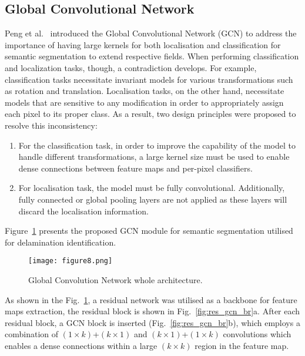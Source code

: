 \documentclass[runningheads]{llncs}
\begin{document}
\subsection{Global Convolutional Network}
Peng et al.~\cite{Peng2017} introduced the Global Convolutional Network (GCN) to address the importance of having large kernels for both localisation and classification for semantic segmentation to extend respective fields.
When performing classification and localization tasks, though, a contradiction develops.
For example, classification tasks necessitate invariant models for various transformations such as rotation and translation.
Localisation tasks, on the other hand, necessitate models that are sensitive to any modification in order to appropriately assign each pixel to its proper class.
As a result, two design principles were proposed to resolve this inconsistency:
\begin{enumerate}
	\item For the classification task, in order to improve the capability of 
	the model to handle different transformations, a large kernel size must be 
	used to enable dense connections between feature maps and per-pixel 
	classifiers.
	\item For localisation task, the model must be fully convolutional. 
	Additionally, fully connected or global pooling layers are not applied as 
	these layers will discard the localisation information. 
\end{enumerate}
Figure~\ref{fig:gcn} presents the proposed GCN module for semantic segmentation 
utilised for delamination identification.
\begin{figure} [h!]
	\begin{center}
		\texttt{[image: figure8.png]}
	\end{center}
	\caption{Global Convolution Network whole architecture.} 
	\label{fig:gcn}
\end{figure}
As shown in the Fig.~\ref{fig:gcn}, a residual network was utilised as a backbone for 
feature maps extraction, the residual block is shown in 
Fig.~\ref{fig:res_gcn_br}a.
After each residual block, a GCN block is inserted  
(Fig.~\ref{fig:res_gcn_br}b), which employs a combination of \((1\times 
k)\)+\((k\times 1)\) and \((k\times 1)\)+\((1\times k)\) convolutions which 
enables a dense connections within a large \((k\times k)\) region in the 
feature map.
\end{document}
